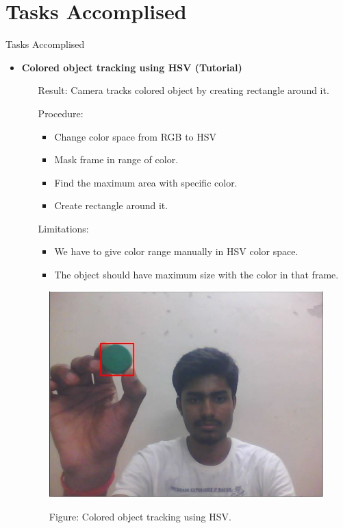 \documentclass[10pt, a4paper]{beamer}
\begin{document}
\section{Tasks Accomplised}
\begin{frame}{Tasks Accomplised}
	\begin{itemize}
		\item \textbf{Colored object tracking using HSV (Tutorial)}
		\begin{itemize}
			\item[Result:] Camera tracks colored object by creating rectangle around it.
			\item[Procedure:]
			\begin{itemize}
				\item Change color space from RGB to HSV
				\item Mask frame in range of color.
				\item Find the maximum area with specific color.
				\item Create rectangle around it.
			\end{itemize}
			\item[Limitations:]
			\begin{itemize}
				\item We have to give color range manually in HSV color space.
				\item The object should have maximum size with the color in that frame.
			\end{itemize}
		\end{itemize}
		\begin{figure}
			\begin{center}
				\includegraphics[scale=0.2]{image1.jpg}
			\end{center}
			\begin{center}
				Figure: Colored object tracking using HSV.
			\end{center}
		\end{figure}
	\end{itemize}
\end{frame}
\end{document}
